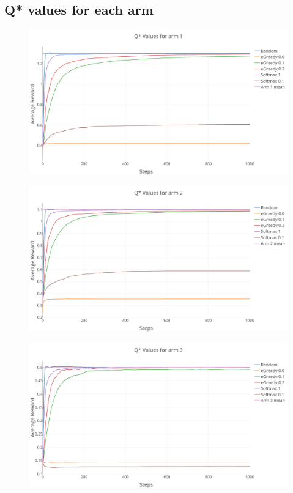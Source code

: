 \documentclass[a4paper, 11pt]{article}
\begin{document}
\subsection{Q* values for each arm}

\begin{figure}[H]
	\centering
    \includegraphics[width=1\linewidth]{ex1_Q1_reward}
\end{figure}

\begin{figure}[H]
	\centering
    \includegraphics[width=1\linewidth]{ex1_Q2_reward}
\end{figure}

\begin{figure}[H]
	\centering
    \includegraphics[width=1\linewidth]{ex1_Q3_reward}
\end{figure}
\end{document}
